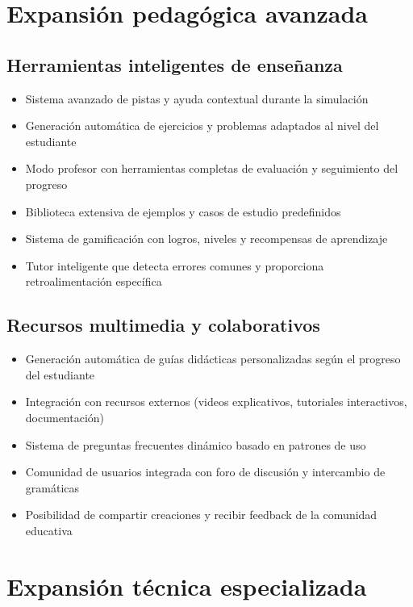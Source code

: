 \section{Expansión pedagógica avanzada}

\subsection{Herramientas inteligentes de enseñanza}

\begin{itemize}
 \item Sistema avanzado de pistas y ayuda contextual durante la simulación
 \item Generación automática de ejercicios y problemas adaptados al nivel del estudiante
 \item Modo profesor con herramientas completas de evaluación y seguimiento del progreso
 \item Biblioteca extensiva de ejemplos y casos de estudio predefinidos
 \item Sistema de gamificación con logros, niveles y recompensas de aprendizaje
 \item Tutor inteligente que detecta errores comunes y proporciona retroalimentación específica
\end{itemize}

\subsection{Recursos multimedia y colaborativos}

\begin{itemize}
 \item Generación automática de guías didácticas personalizadas según el progreso del estudiante
 \item Integración con recursos externos (videos explicativos, tutoriales interactivos, documentación)
 \item Sistema de preguntas frecuentes dinámico basado en patrones de uso
 \item Comunidad de usuarios integrada con foro de discusión y intercambio de gramáticas
 \item Posibilidad de compartir creaciones y recibir feedback de la comunidad educativa
\end{itemize}

\section{Expansión técnica especializada}

